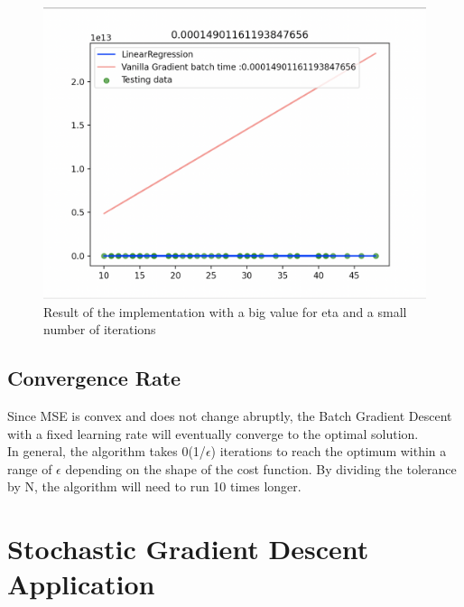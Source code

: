 \documentclass[conference]{IEEEtran}
\begin{document}
\begin{figure}[ht]
    \includegraphics[scale=0.35]{Fig3.png}
    \caption{Result of the implementation with a big value for eta and a small number of iterations}
    \label{fig:va_gr_ben_eta_big}
\end{figure}


\subsection{Convergence Rate}
Since MSE is convex and does not change abruptly, the
Batch Gradient Descent with a fixed learning rate will eventually converge to the optimal solution. \\
In general, the algorithm takes 0(1/$\epsilon$) iterations to reach the  optimum within a range of $\epsilon$ depending on the shape of the cost function. By dividing the tolerance by N, the algorithm will need to run 10 times longer. \cite{Scikit-Learn}


\section{Stochastic Gradient Descent Application}
\end{document}
